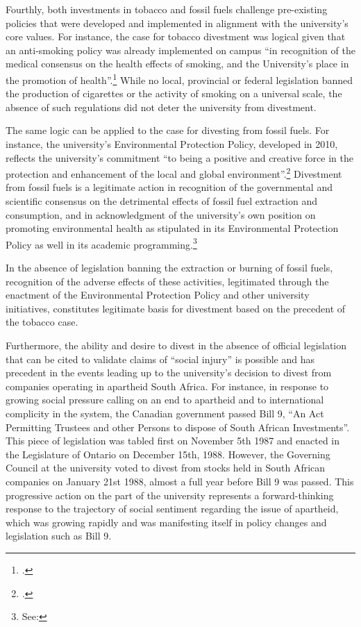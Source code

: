 Fourthly, both investments in tobacco and fossil fuels challenge pre-existing policies that were developed and implemented in alignment with the university's core values. 
For instance, the case for tobacco divestment was logical given that an anti-smoking policy was already implemented on campus ``in recognition of the medical consensus on the health effects of smoking, and the University's place in the promotion of health''.\footcite[See: ][p. 9]{TobaccoReport_2007}
While no local, provincial or federal legislation banned the production of cigarettes or the activity of smoking on a universal scale, the absence of such regulations did not deter the university from divestment. 



The same logic can be applied to the case for divesting from fossil fuels. 
For instance, the university's Environmental Protection Policy, developed in 2010, reflects the university's commitment ``to being a positive and creative force in the protection and enhancement of the local and global environment''.\footcite[][]{UTEnvProtectionPolicy}
Divestment from fossil fuels is a legitimate action in recognition of the governmental and scientific consensus on the detrimental effects of fossil fuel extraction and consumption, and in acknowledgment of the university's own position on promoting environmental health as stipulated in its Environmental Protection Policy as well in its academic programming.\footnote{See: }



In the absence of legislation banning the extraction or burning of fossil fuels, recognition of the adverse effects of these activities, legitimated through the enactment of the Environmental Protection Policy and other university initiatives, constitutes legitimate basis for divestment based on the precedent of the tobacco case.  



Furthermore, the ability and desire to divest in the absence of official legislation that can be cited to validate claims of ``social injury'' is possible and has precedent in the events leading up to the university's decision to divest from companies operating in apartheid South Africa. 
For instance, in response to growing social pressure calling on an end to apartheid and to international complicity in the system, the Canadian government passed Bill 9, ``An Act Permitting Trustees and other Persons to dispose of South African Investments''.
This piece of legislation was tabled first on November 5th 1987 and enacted in the Legislature of Ontario on December 15th, 1988. 
However, the Governing Council at the university voted to divest from stocks held in South African companies on January 21st 1988, almost a full year before Bill 9 was passed. 
This progressive action on the part of the university represents a forward-thinking response to the trajectory of social sentiment regarding the issue of apartheid, which was growing rapidly and was manifesting itself in policy changes and legislation such as Bill 9. 



